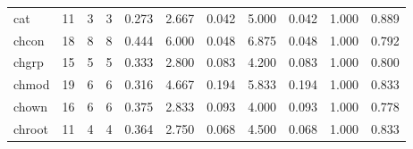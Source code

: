 \begin{longtable}{lp{1.2cm}p{1.2cm}p{1.2cm}p{1.2cm}p{1.2cm}p{1.2cm}p{1.2cm}p{1.2cm}p{1.2cm}p{1.2cm}}
cat       &                           11 &                  3 &                                 3 &                                      0.273 &                                  2.667 &                                        0.042 &                             5.000 &                                   0.042 &                              1.000 &                                              0.889 \\
chcon     &                           18 &                  8 &                                 8 &                                      0.444 &                                  6.000 &                                        0.048 &                             6.875 &                                   0.048 &                              1.000 &                                              0.792 \\
chgrp     &                           15 &                  5 &                                 5 &                                      0.333 &                                  2.800 &                                        0.083 &                             4.200 &                                   0.083 &                              1.000 &                                              0.800 \\
chmod     &                           19 &                  6 &                                 6 &                                      0.316 &                                  4.667 &                                        0.194 &                             5.833 &                                   0.194 &                              1.000 &                                              0.833 \\
chown     &                           16 &                  6 &                                 6 &                                      0.375 &                                  2.833 &                                        0.093 &                             4.000 &                                   0.093 &                              1.000 &                                              0.778 \\
chroot    &                           11 &                  4 &                                 4 &                                      0.364 &                                  2.750 &                                        0.068 &                             4.500 &                                   0.068 &                              1.000 &                                              0.833 \\

\end{longtable}
